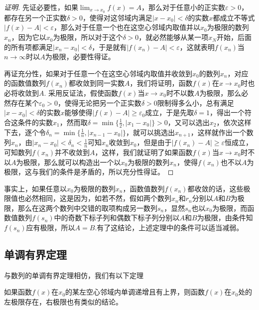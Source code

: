 \begin{proof}[证明]
  先证必要性，如果$\lim_{x \to x_0} f(x) = A$，那么对于任意小的正实数$\varepsilon > 0$，都存在另一个正实数$\delta > 0$，使得对这邻域内满足$|x-x_0|<\delta$的实数$x$都成立不等式$|f(x)-A|<\varepsilon$，那么对于任意一个也在这空心邻域内取值并以$x_0$为极限的数列$x_n$，因为它以$x_0$为极限，所以对于这个$\delta>0$，就必然能够从某一项$x_N$开始，后面的所有项都满足$|x_n-x_0|<\delta$，于是就有$|f(x_n)-A|<\varepsilon$，这就表明$f(x_n)$当$n \to \infty$时以$A$为极限，必要性得证。

  再证充分性，如果对于任意一个在这空心邻域内取值并收敛到$x_0$的数列$x_n$，对应的函数值数列$f(x_n)$都收敛到同一实数$A$，我们将证明，函数$f(x)$在$x \to x_0$时也必将收敛到$A$. 采用反证法，假使函数$f(x)$当$x \to x_0$时不以数$A$为极限，那么必然存在某个$\varepsilon_0>0$，使得无论把另一个正实数$\delta>0$限制得多么小，总有满足$|x-x_0|<\delta$的实数$x$能够使得$|f(x)-A| \geqslant \varepsilon_0$成立，于是先取$\delta=1$，得出一个符合这条件的实数$x_1$，然而取$\delta=\min\{\frac{1}{2}, |x_1-x_0|\}>0$，又可以选出$x_2$，依次这样下去，逐个令$\delta_n=\min\{\frac{1}{n}, |x_{n-1}-x_0|\}$，就可以挑选出$x_{n+1}$，这样就作出一个数列$x_n$，由$|x_n-x_0|<\delta_n<\frac{1}{n}$可知$x_n$收敛到$x_0$，但是由于$|f(x_n)-A| \geqslant \varepsilon$恒成立，可知数列$f(x_n)$并不收敛到$A$，这样，我们就证明了如果函数$f(x)$当$x \to x_0$时不以$A$为极限，那么就可以构造出一个以$x_0$为极限的数列$x_n$，使得$f(x_n)$也不以$A$为极限，这与我们的条件是矛盾的，所以充分性得证。
\end{proof}

事实上，如果任意以$x_0$为极限的数列$x_n$，函数值数列$f(x_n)$都收敛的话，这些极限值也必然相同，这是因为，如若不然，假如两个数列$x_n$和$r_n$分别以$A$和$B$为极限，那么在这两个数列中交错的取项构成另一数列$s_n$，显然$s_n$也以$x_0$为极限，而函数值数列$f(s_n)$中的奇数下标子列和偶数下标子列分别以$A$和$B$为极限，由条件知$f(s_n)$应有极限，所以$A=B$.有了这结论，上述定理中的条件可以适当减弱。


\subsection{单调有界定理}
\label{sec:theorem-of-monotone-and-bounded-of-function-limit}

与数列的单调有界定理相仿，我们有以下定理
\begin{theorem}
  如果函数$f(x)$在$x_0$的某左空心邻域内单调递增且有上界，则函数$f(x)$在$x_0$处的左极限存在，右极限也有类似的结论。
\end{theorem}


